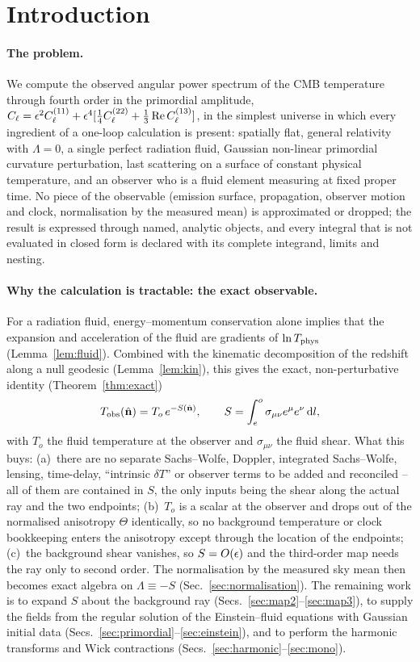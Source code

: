 \section{Introduction}
\label{sec:intro}

\paragraph{The problem.}  We compute the observed angular power spectrum of the CMB temperature through fourth order in the
primordial amplitude, $C_\ell=\epsilon^2C^{(11)}_\ell+\epsilon^4[\tfrac14C^{(22)}_\ell+\tfrac13\operatorname{Re} C^{(13)}_\ell]$, in the simplest
universe in which every ingredient of a one-loop calculation is present: spatially flat, general relativity with $\Lambda=0$,
a single perfect radiation fluid, Gaussian non-linear primordial curvature perturbation, last scattering on a surface of
constant physical temperature, and an observer who is a fluid element measuring at fixed proper time.  No piece of the
observable (emission surface, propagation, observer motion and clock, normalisation by the measured mean) is approximated or
dropped; the result is expressed through named, analytic objects, and every integral that is not evaluated in closed form is
declared with its complete integrand, limits and nesting.

\paragraph{Why the calculation is tractable: the exact observable.}  For a radiation fluid, energy--momentum conservation alone
implies that the expansion and acceleration of the fluid are gradients of $\ln T_{\rm phys}$ (Lemma~\ref{lem:fluid}).  Combined with
the kinematic decomposition of the redshift along a null geodesic (Lemma~\ref{lem:kin}), this gives the exact, non-perturbative
identity (Theorem~\ref{thm:exact})
\begin{equation*}
T_{\rm obs}(\hat{\mathbf n})=T_o\,e^{-S(\hat{\mathbf n})},\qquad S=\int_e^o\sigma_{\mu\nu}e^\mu e^\nu\,\mathrm d l ,
\end{equation*}
with $T_o$ the fluid temperature at the observer and $\sigma_{\mu\nu}$ the fluid shear.  What this buys: (a)~there are no separate
Sachs--Wolfe, Doppler, integrated Sachs--Wolfe, lensing, time-delay, ``intrinsic $\delta T$'' or observer terms to be added and
reconciled -- all of them are contained in $S$, the only inputs being the shear along the actual ray and the two endpoints;
(b)~$T_o$ is a scalar at the observer and drops out of the normalised anisotropy $\Theta$ identically, so no background
temperature or clock bookkeeping enters the anisotropy except through the location of the endpoints; (c)~the background shear
vanishes, so $S=O(\epsilon)$ and the third-order map needs the ray only to second order.  The normalisation by the measured sky mean
then becomes exact algebra on $\Lambda\equiv-S$ (Sec.~\ref{sec:normalisation}).  The remaining work is to expand $S$ about the
background ray (Secs.~\ref{sec:map2}--\ref{sec:map3}), to supply the fields from the regular solution of the Einstein--fluid
equations with Gaussian initial data (Secs.~\ref{sec:primordial}--\ref{sec:einstein}), and to perform the harmonic transforms and
Wick contractions (Secs.~\ref{sec:harmonic}--\ref{sec:mono}).

